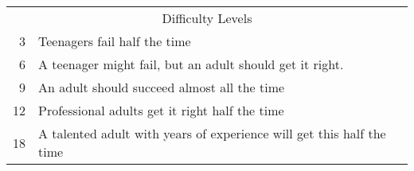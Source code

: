 \begin{tabularx}{\marginparwidth}{rX}
\multicolumn{2}{c}{Difficulty Levels} \\
3 & Teenagers fail half the time \\
6 & A teenager might fail, but an adult should get it right. \\
9 & An adult should succeed almost all the time \\
12 & Professional adults get it right half the time \\
18 & A talented adult with years of experience will get this half the time \\
\end{tabularx}